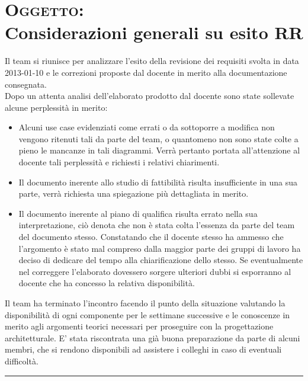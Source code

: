 \documentclass[a4paper,10pt,openright]{article}
\begin{document}
\section*{{\textsc{Oggetto:} \\Considerazioni generali su esito RR}}
Il team si riunisce per analizzare l'esito della revisione dei requisiti svolta in data 2013-01-10 e le correzioni proposte dal docente in merito alla documentazione consegnata.\\
Dopo un attenta analisi dell'elaborato prodotto dal docente sono state sollevate alcune perplessità in merito:
\begin{itemize}
\item Alcuni use case evidenziati come errati o da sottoporre a modifica non vengono ritenuti tali da parte del team, o quantomeno non sono state colte a pieno le mancanze in tali diagrammi. Verrà pertanto portata all'attenzione al docente tali perplessità e richiesti i relativi chiarimenti.
\item Il documento inerente allo studio di fattibilità risulta insufficiente in una sua parte, verrà richiesta una spiegazione più dettagliata in merito.
\item Il documento inerente al piano di qualifica risulta errato nella sua interpretazione, ciò denota che non è stata colta l'essenza da parte del team del documento stesso. Constatando che il docente stesso ha ammesso che l'argomento è stato mal compreso dalla maggior parte dei gruppi di lavoro ha deciso di dedicare del tempo alla chiarificazione dello stesso. Se eventualmente nel correggere l'elaborato dovessero sorgere ulteriori dubbi si esporranno al docente che ha concesso la relativa disponibilità.
\end{itemize}
Il team ha terminato l'incontro facendo il punto della situazione valutando la disponibilità di ogni componente per le settimane successive e le conoscenze in merito agli argomenti teorici necessari per proseguire con la progettazione architetturale. E' stata riscontrata una già buona preparazione da parte di alcuni membri, che si rendono disponibili ad assistere i colleghi in caso di eventuali difficoltà.
\noindent\rule{\textwidth}{0.4pt}
\end{document}
